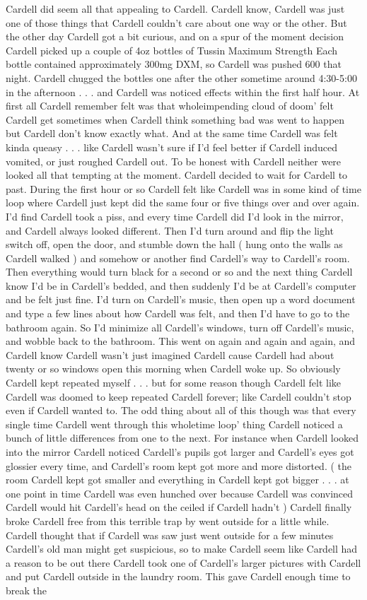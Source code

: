 \documentclass[12pt]{book}
\begin{document}
Cardell did seem all that appealing to Cardell. Cardell know, Cardell was just one of those things that Cardell couldn't care about one way or the other. But the other day Cardell got a bit curious, and on a spur of the moment decision Cardell picked up a couple of 4oz bottles of Tussin Maximum Strength Each bottle contained approximately 300mg DXM, so Cardell was pushed 600 that night. Cardell chugged the bottles one after the other sometime around 4:30-5:00 in the afternoon . . . and Cardell was noticed effects within the first half hour. At first all Cardell remember felt was that wholeimpending cloud of doom' felt Cardell get sometimes when Cardell think something bad was went to happen but Cardell don't know exactly what. And at the same time Cardell was felt kinda queasy . . . like Cardell wasn't sure if I'd feel better if Cardell induced vomited, or just roughed Cardell out. To be honest with Cardell neither were looked all that tempting at the moment. Cardell decided to wait for Cardell to past. During the first hour or so Cardell felt like Cardell was in some kind of time loop where Cardell just kept did the same four or five things over and over again. I'd find Cardell took a piss, and every time Cardell did I'd look in the mirror, and Cardell always looked different. Then I'd turn around and flip the light switch off, open the door, and stumble down the hall ( hung onto the walls as Cardell walked ) and somehow or another find Cardell's way to Cardell's room. Then everything would turn black for a second or so and the next thing Cardell know I'd be in Cardell's bedded, and then suddenly I'd be at Cardell's computer and be felt just fine. I'd turn on Cardell's music, then open up a word document and type a few lines about how Cardell was felt, and then I'd have to go to the bathroom again. So I'd minimize all Cardell's windows, turn off Cardell's music, and wobble back to the bathroom. This went on again and again and again, and Cardell know Cardell wasn't just imagined Cardell cause Cardell had about twenty or so windows open this morning when Cardell woke up. So obviously Cardell kept repeated myself . . . but for some reason though Cardell felt like Cardell was doomed to keep repeated Cardell forever; like Cardell couldn't stop even if Cardell wanted to. The odd thing about all of this though was that every single time Cardell went through this wholetime loop' thing Cardell noticed a bunch of little differences from one to the next. For instance when Cardell looked into the mirror Cardell noticed Cardell's pupils got larger and Cardell's eyes got glossier every time, and Cardell's room kept got more and more distorted. ( the room Cardell kept got smaller and everything in Cardell kept got bigger . . . at one point in time Cardell was even hunched over because Cardell was convinced Cardell would hit Cardell's head on the ceiled if Cardell hadn't ) Cardell finally broke Cardell free from this terrible trap by went outside for a little while. Cardell thought that if Cardell was saw just went outside for a few minutes Cardell's old man might get suspicious, so to make Cardell seem like Cardell had a reason to be out there Cardell took one of Cardell's larger pictures with Cardell and put Cardell outside in the laundry room. This gave Cardell enough time to break the 
\end{document}
